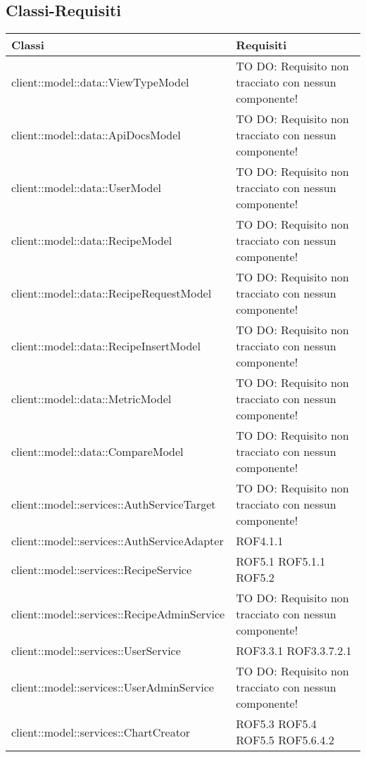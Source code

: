 \subsection{Classi-Requisiti} %
\label{sub:classi_requisiti}
\begin{center}
\def\arraystretch{1.5}
\bgroup
\begin{longtable}{| p{11cm} | p{2.5cm} |}
\hline
\textbf{Classi} & \textbf{Requisiti} \\
\hline
client::model::data::ViewTypeModel & TO DO: Requisito non tracciato con nessun componente! \\
\hline
client::model::data::ApiDocsModel & TO DO: Requisito non tracciato con nessun componente! \\
\hline
client::model::data::UserModel & TO DO: Requisito non tracciato con nessun componente! \\
\hline
client::model::data::RecipeModel & TO DO: Requisito non tracciato con nessun componente! \\
\hline
client::model::data::RecipeRequestModel & TO DO: Requisito non tracciato con nessun componente! \\
\hline
client::model::data::RecipeInsertModel & TO DO: Requisito non tracciato con nessun componente! \\
\hline
client::model::data::MetricModel & TO DO: Requisito non tracciato con nessun componente! \\
\hline
client::model::data::CompareModel & TO DO: Requisito non tracciato con nessun componente! \\
\hline
client::model::services::AuthServiceTarget & TO DO: Requisito non tracciato con nessun componente! \\
\hline
client::model::services::AuthServiceAdapter & ROF4.1.1 \\
\hline
client::model::services::RecipeService & ROF5.1 \newline ROF5.1.1 \newline ROF5.2 \\
\hline
client::model::services::RecipeAdminService & TO DO: Requisito non tracciato con nessun componente! \\
\hline
client::model::services::UserService & ROF3.3.1 \newline ROF3.3.7.2.1 \\
\hline
client::model::services::UserAdminService & TO DO: Requisito non tracciato con nessun componente! \\
\hline
client::model::services::ChartCreator & ROF5.3 \newline ROF5.4 \newline ROF5.5 \newline ROF5.6.4.2 \\

\end{longtable}
\end{center}

